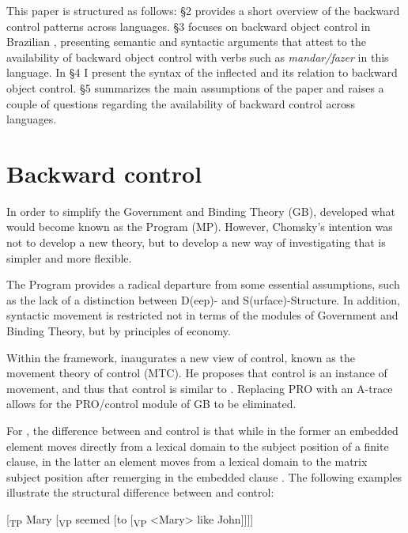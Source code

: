 \documentclass[output=paper]{langsci/langscibook}
\begin{document}
This paper is structured as follows: §2 provides a short overview of the backward control patterns across languages. §3 focuses on backward object control in Brazilian , presenting semantic and syntactic arguments that attest to the availability of backward object control with verbs such as \textit{mandar\slash fazer} in this language. In §4 I present the syntax of the inflected  and its relation to backward object control. §5 summarizes the main assumptions of the paper and raises a couple of questions regarding the availability of backward control across languages.

\section{Backward control}%

In order to simplify the Government and Binding Theory (GB), \citet{Chomsky1993} developed what would become known as the  Program (MP). However, Chomsky’s intention was not to develop a new theory, but to develop a new way of investigating that is simpler and more flexible.

The  Program provides a radical departure from some essential assumptions, such as the lack of a distinction between D(eep)- and S(urface)-Struc\-ture. In addition, syntactic movement is restricted not in terms of the modules of Government and Binding Theory, but by principles of economy. 

Within the  framework, \citet{Hornstein1999,Hornstein2001} inaugurates a new view of control, known as the movement theory of control (MTC). He proposes that control is an instance of movement, and thus that control is similar to . Replacing PRO with an A-trace allows for the PRO\slash control module of GB to be eliminated.

For \citet{Hornstein1999}, the difference between  and control is that while in the former an embedded element moves directly from a lexical domain to the subject position of a finite clause, in the latter an element moves from a lexical domain to the matrix subject position after remerging in the embedded clause \citep{Boeckx2006}. The following examples illustrate the structural difference between  and control:

\ea%
    \label{ex:moreno:3b}
[\textsubscript{TP} Mary [\textsubscript{VP} seemed [to [\textsubscript{VP} <Mary> like John]]]]
\z
\end{document}
